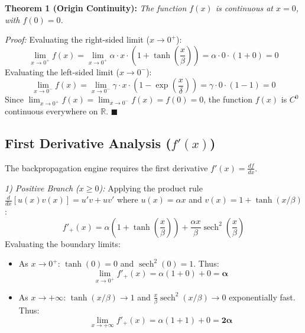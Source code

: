 \documentclass[conference]{IEEEtran}
\begin{document}
\textbf{Theorem 1 (Origin Continuity):} \textit{The function $f(x)$ is continuous at $x = 0$, with $f(0) = 0$.}

\textit{Proof:}
Evaluating the right-sided limit ($x \to 0^+$):
\begin{equation}
\lim_{x \to 0^+} f(x) = \lim_{x \to 0^+} \alpha \cdot x \cdot \left( 1 + \tanh\left(\frac{x}{\beta}\right) \right) = \alpha \cdot 0 \cdot (1 + 0) = 0
\end{equation}
Evaluating the left-sided limit ($x \to 0^-$):
\begin{equation}
\lim_{x \to 0^-} f(x) = \lim_{x \to 0^-} \gamma \cdot x \cdot \left( 1 - \exp\left(\frac{x}{\delta}\right) \right) = \gamma \cdot 0 \cdot (1 - 1) = 0
\end{equation}
Since $\lim_{x \to 0^+} f(x) = \lim_{x \to 0^-} f(x) = f(0) = 0$, the function $f(x)$ is $C^0$ continuous everywhere on $\mathbb{R}$. \hfill $\blacksquare$

\subsection{First Derivative Analysis ($f'(x)$)}
The backpropagation engine requires the first derivative $f'(x) = \frac{df}{dx}$.

\textit{1) Positive Branch ($x \ge 0$):}
Applying the product rule $\frac{d}{dx}[u(x)v(x)] = u'v + uv'$ where $u(x) = \alpha x$ and $v(x) = 1 + \tanh(x/\beta)$:
\begin{equation}
f'_+(x) = \alpha \left( 1 + \tanh\left(\frac{x}{\beta}\right) \right) + \frac{\alpha x}{\beta} \operatorname{sech}^2\left(\frac{x}{\beta}\right)
\end{equation}
Evaluating the boundary limits:
\begin{itemize}
    \item As $x \to 0^+$: $\tanh(0) = 0$ and $\operatorname{sech}^2(0) = 1$. Thus:
    \begin{equation}
    \lim_{x \to 0^+} f'_+(x) = \alpha(1 + 0) + 0 = \mathbf{\alpha}
    \end{equation}
    \item As $x \to +\infty$: $\tanh(x/\beta) \to 1$ and $\frac{x}{\beta}\operatorname{sech}^2(x/\beta) \to 0$ exponentially fast. Thus:
    \begin{equation}
    \lim_{x \to +\infty} f'_+(x) = \alpha(1 + 1) + 0 = \mathbf{2\alpha}
    \end{equation}
\end{itemize}
\end{document}
